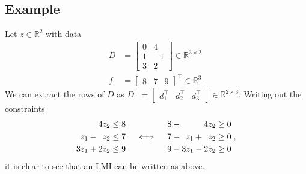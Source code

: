 \documentclass[a4paper]{article}
\begin{document}
\subsection*{Example}
Let $z\in\mathbb{R}^2$ with data
\begin{align*}
D &= \begin{bmatrix}0&4\\1&-1\\3&2\end{bmatrix}\in\mathbb{R}^{3\times 2} \\
f &= \begin{bmatrix}8&7&9\end{bmatrix}^\top\in\mathbb{R}^3.
\end{align*}
We can extract the rows of $D$ as $D^\top = \begin{bmatrix}d_1^\top & d_2^\top & d_3^\top\end{bmatrix}\in\mathbb{R}^{2\times 3}$.
Writing out the constraints
\begin{equation*}
\begin{split}
\hphantom{0z_1{}+{}} 4z_2 &\le 8 \\
\hphantom{0}z_1 - \hphantom{0}z_2 &\le 7 \\
3z_1 + 2z_2 &\le 9
\end{split}
\quad\iff\quad
\begin{split}
8 - \hphantom{0z_1{}+{}} 4z_2 &\ge 0 \\
7 - \hphantom{0}z_1 + \hphantom{0}z_2 &\ge 0 \\
9 - 3z_1 - 2z_2 &\ge 0
\end{split}\;,
\end{equation*}
it is clear to see that an LMI can be written as above.
\end{document}
